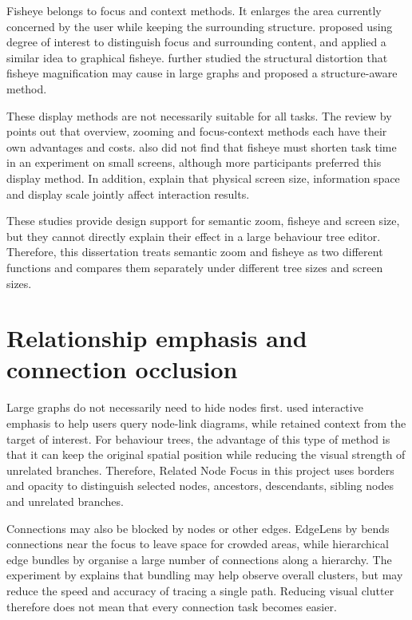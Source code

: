 Fisheye belongs to focus and context methods. It enlarges the area currently concerned by the user while keeping the surrounding structure. \textcite{furnas1986fisheye} proposed using degree of interest to distinguish focus and surrounding content, and \textcite{sarkar1994graphical} applied a similar idea to graphical fisheye. \textcite{wang2019fisheye} further studied the structural distortion that fisheye magnification may cause in large graphs and proposed a structure-aware method.

These display methods are not necessarily suitable for all tasks. The review by \textcite{cockburn2009review} points out that overview, zooming and focus-context methods each have their own advantages and costs. \textcite{buring2006scatterplots} also did not find that fisheye must shorten task time in an experiment on small screens, although more participants preferred this display method. In addition, \textcite{jakobsen2013interactive} explain that physical screen size, information space and display scale jointly affect interaction results.

These studies provide design support for semantic zoom, fisheye and screen size, but they cannot directly explain their effect in a large behaviour tree editor. Therefore, this dissertation treats semantic zoom and fisheye as two different functions and compares them separately under different tree sizes and screen sizes.

\section{Relationship emphasis and connection occlusion}

Large graphs do not necessarily need to hide nodes first. \textcite{ware2005queries} used interactive emphasis to help users query node-link diagrams, while \textcite{vanham2009search} retained context from the target of interest. For behaviour trees, the advantage of this type of method is that it can keep the original spatial position while reducing the visual strength of unrelated branches. Therefore, Related Node Focus in this project uses borders and opacity to distinguish selected nodes, ancestors, descendants, sibling nodes and unrelated branches.

Connections may also be blocked by nodes or other edges. EdgeLens by \textcite{wong2003edgelens} bends connections near the focus to leave space for crowded areas, while hierarchical edge bundles by \textcite{holten2006hierarchical} organise a large number of connections along a hierarchy. The experiment by \textcite{mcgee2012bundling} explains that bundling may help observe overall clusters, but may reduce the speed and accuracy of tracing a single path. Reducing visual clutter therefore does not mean that every connection task becomes easier.

